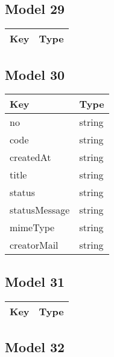 \documentclass[10pt]{article}
\begin{document}
            \subsection{Model 29}
            
            \begin{tabularx}{\textwidth}{lZ}
                \textbf{Key} & \textbf{Type} \\
                \hline
            \end{tabularx}
            \subsection{Model 30}
            
            \begin{tabularx}{\textwidth}{lZ}
                \textbf{Key} & \textbf{Type} \\
                \hline
                    no & string \\
                    code & string \\
                    createdAt & string \\
                    title & string \\
                    status & string \\
                    statusMessage & string \\
                    mimeType & string \\
                    creatorMail & string \\
            \end{tabularx}
            \subsection{Model 31}
            
            \begin{tabularx}{\textwidth}{lZ}
                \textbf{Key} & \textbf{Type} \\
                \hline
            \end{tabularx}
            \subsection{Model 32}
            
\end{document}
